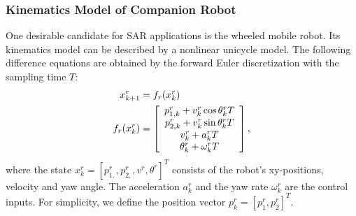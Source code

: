 \documentclass[journal]{IEEEtran}
\begin{document}
\subsubsection{Kinematics Model of Companion Robot} 
One desirable candidate for SAR applications is the wheeled mobile robot. Its kinematics model can be described by a nonlinear unicycle model. The following difference equations are obtained by the forward Euler discretization with the sampling time $T$:
\begin{align}
	x^r_{k+1}&=f_r(x^r_k)\notag\\
    f_r(x^r_k)&=\left[
			\begin{array}{c}
				p^r_{1,k}+v^r_k\cos \theta^r_k T\\
				p^r_{2,k}+v^r_k\sin \theta^r_k T\\			
            v^r_k+a^r_k T\\
		    \theta^r_k+\omega^r_k T
            \end{array}\right],\label{eqn:robot_model}
\end{align}
where the state $x^r_k=\left[p^r_{1,}, p^r_{2,}, v^r, \theta^r\right]^T$ consists of the robot's xy-positions, velocity and yaw angle. The acceleration $a^r_k$ and the yaw rate $\omega^r_k$ are the control inputs. For simplicity, we define the position vector $p^r_k =\left[p^r_{1}, p^r_{2}\right]^T$. 
\end{document}
